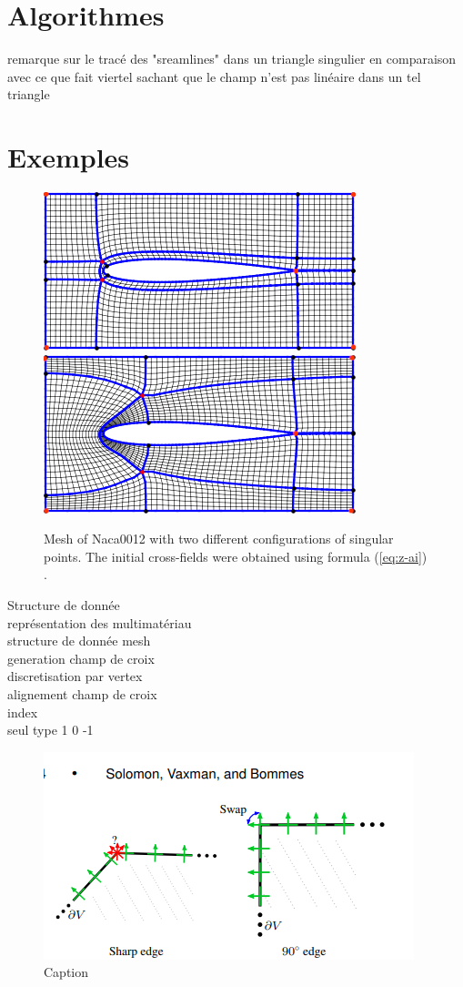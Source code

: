 \section*{Algorithmes}
\color{blue}
remarque sur le tracé des "sreamlines" dans un triangle singulier en comparaison avec ce que fait viertel sachant que le champ n'est pas linéaire dans un tel triangle
\color{black}


\section*{Exemples}

\begin{figure}[!h]
\centering
\includegraphics[scale=0.65]{images/nacas_normal.png}\hspace{0.5cm}
\includegraphics[scale=0.65]{images/naca_obus.png}
\caption{Mesh of Naca0012 with two different configurations of singular points. The initial cross-fields were obtained using formula (\ref{eq:z-ai}) .}
\label{connexe2}
\end{figure}

Structure de donnée\\
représentation des multimatériau\\


structure de donnée mesh
\[\]
generation champ de croix\\
discretisation par vertex\\
alignement champ de croix
\[\]
index\\
seul type 1 0 -1
\begin{figure}
    \centering
    \includegraphics{images/inspi_1.png}
    \caption{Caption}
    \label{fig:enter-label}
\end{figure}

